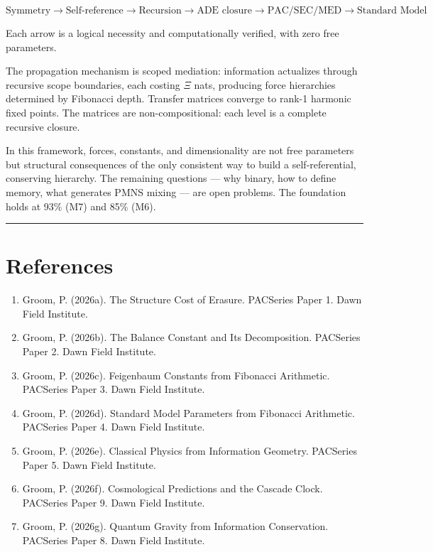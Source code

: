 \documentclass[11pt,a4paper]{article}
\providecommand{\tightlist}{\setlength{\itemsep}{0pt}\setlength{\parskip}{0pt}}
\begin{document}
\[\text{Symmetry} \to \text{Self-reference} \to \text{Recursion} \to \text{ADE closure} \to \text{PAC/SEC/MED} \to \text{Standard Model}\]

Each arrow is a logical necessity and computationally verified, with zero free parameters.

The propagation mechanism is scoped mediation: information actualizes through recursive scope boundaries, each costing $\Xi$ nats, producing force hierarchies determined by Fibonacci depth. Transfer matrices converge to rank-1 harmonic fixed points. The matrices are non-compositional: each level is a complete recursive closure.

In this framework, forces, constants, and dimensionality are not free parameters but structural consequences of the only consistent way to build a self-referential, conserving hierarchy. The remaining questions — why binary, how to define memory, what generates PMNS mixing — are open problems. The foundation holds at 93\% (M7) and 85\% (M6).

\begin{center}\rule{0.5\linewidth}{0.4pt}\end{center}

\section*{References}

\begin{enumerate}\tightlist
\item Groom, P. (2026a). The Structure Cost of Erasure. PACSeries Paper 1. Dawn Field Institute.
\item Groom, P. (2026b). The Balance Constant and Its Decomposition. PACSeries Paper 2. Dawn Field Institute.
\item Groom, P. (2026c). Feigenbaum Constants from Fibonacci Arithmetic. PACSeries Paper 3. Dawn Field Institute.
\item Groom, P. (2026d). Standard Model Parameters from Fibonacci Arithmetic. PACSeries Paper 4. Dawn Field Institute.
\item Groom, P. (2026e). Classical Physics from Information Geometry. PACSeries Paper 5. Dawn Field Institute.
\item Groom, P. (2026f). Cosmological Predictions and the Cascade Clock. PACSeries Paper 9. Dawn Field Institute.
\item Groom, P. (2026g). Quantum Gravity from Information Conservation. PACSeries Paper 8. Dawn Field Institute.
\end{enumerate}
\end{document}
